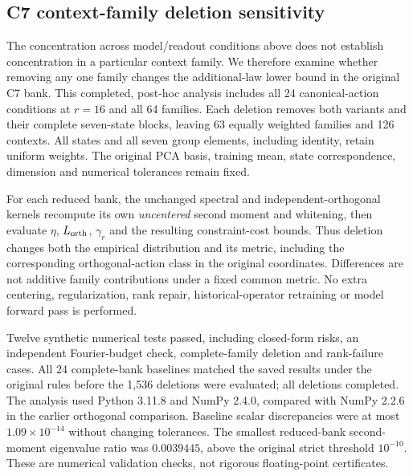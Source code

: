 \subsection{C7 context-family deletion sensitivity}
\label{app:c7-family-influence}
The concentration across model/readout conditions above does not establish concentration in a particular context family. We therefore examine whether removing any one family changes the additional-law lower bound in the original C7 bank. This completed, post-hoc analysis includes all 24 canonical-action conditions at $r=16$ and all 64 families. Each deletion removes both variants and their complete seven-state blocks, leaving 63 equally weighted families and 126 contexts. All states and all seven group elements, including identity, retain uniform weights. The original PCA basis, training mean, state correspondence, dimension and numerical tolerances remain fixed.

For each reduced bank, the unchanged spectral and independent-orthogonal kernels recompute its own \emph{uncentered} second moment and whitening, then evaluate $\eta$, $L_{\rm orth}$, $\gamma_r$ and the resulting constraint-cost bounds. Thus deletion changes both the empirical distribution and its metric, including the corresponding orthogonal-action class in the original coordinates. Differences are not additive family contributions under a fixed common metric. No extra centering, regularization, rank repair, historical-operator retraining or model forward pass is performed.

Twelve synthetic numerical tests passed, including closed-form risks, an independent Fourier-budget check, complete-family deletion and rank-failure cases. All 24 complete-bank baselines matched the saved results under the original rules before the 1,536 deletions were evaluated; all deletions completed. The analysis used Python 3.11.8 and NumPy 2.4.0, compared with NumPy 2.2.6 in the earlier orthogonal comparison. Baseline scalar discrepancies were at most $1.09\times10^{-14}$ without changing tolerances. The smallest reduced-bank second-moment eigenvalue ratio was $0.0039445$, above the original strict threshold $10^{-10}$. These are numerical validation checks, not rigorous floating-point certificates.

\begin{table}[t]
\caption{C7 family-deletion sensitivity of the further-law lower endpoint $\ell^-$, at $r=16$, in all 24 model/readout conditions. Minima and maxima cover all 64 complete-family deletions, each with its own empirical whitening; they are not confidence intervals. The final column counts endpoints satisfying $\ell^->10^{-8}+10^{-7}|\ell^-|$, out of 64. Zero is an inconclusive bound on strict positivity. Values are rounded only for display; full-precision endpoints and family identities are retained.}
\label{tab:c7-family-influence}
\centering\small
\setlength{\tabcolsep}{5pt}

\end{table}
\FloatBarrier

